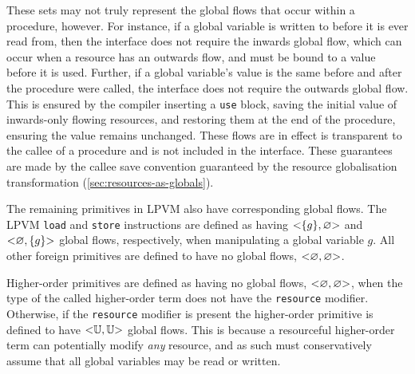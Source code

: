 These sets may not truly represent the global flows that occur within a procedure, however. For instance, if a global variable is written to before it is ever read from, then the interface does not require the inwards global flow, which can occur when a resource has an outwards flow, and must be bound to a value before it is used. Further, if a global variable's value is the same before and after the procedure were called, the interface does not require the outwards global flow. This is ensured by the compiler inserting a \texttt{use} block, saving the initial value of inwards-only flowing resources, and restoring them at the end of the procedure, ensuring the value remains unchanged. These flows are in effect is transparent to the callee of a procedure and is not included in the interface. These guarantees are made by the callee save convention guaranteed by the resource globalisation transformation (\cref{sec:resources-as-globals}).

The remaining primitives in LPVM also have corresponding global flows. The LPVM \texttt{load} and \texttt{store} instructions are defined as having $\mathtt{<}\lbrace g\rbrace, \varnothing\mathtt{>}$ and $\mathtt{<}\varnothing, \lbrace g\rbrace\mathtt{>}$ global flows, respectively, when manipulating a global variable $g$. All other foreign primitives are defined to have no global flows, $\mathtt{<}\varnothing, \varnothing\mathtt{>}$.

Higher-order primitives are defined as having no global flows, $\mathtt{<}\varnothing, \varnothing\mathtt{>}$, when the type of the called higher-order term does not have the \texttt{resource} modifier. Otherwise, if the \texttt{resource} modifier is present the higher-order primitive is defined to have $\mathtt{<}\mathbb{U}, \mathbb{U}\mathtt{>}$ global flows. This is because a resourceful higher-order term can potentially modify \textit{any} resource, and as such must conservatively assume that all global variables may be read or written.

